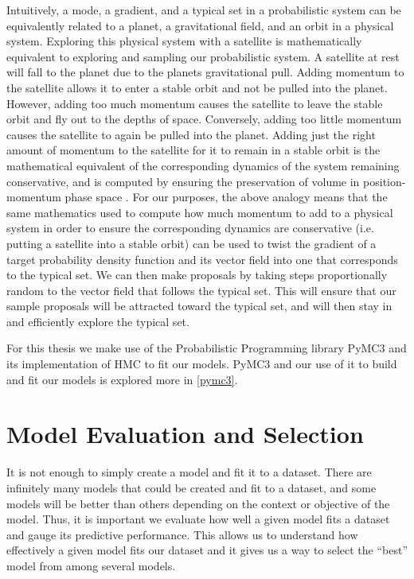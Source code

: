 Intuitively, a mode, a gradient, and a typical set in a probabilistic system can be equivalently related to a planet, a gravitational field, and an orbit in a physical system. Exploring this physical system with a satellite is mathematically equivalent to exploring and sampling our probabilistic system. A satellite at rest will fall to the planet due to the planets gravitational pull. Adding momentum to the satellite allows it to enter a stable orbit and not be pulled into the planet. However, adding too much momentum causes the satellite to leave the stable orbit and fly out to the depths of space. Conversely, adding too little momentum causes the satellite to again be pulled into the planet. Adding just the right amount of momentum to the satellite for it to remain in a stable orbit is the mathematical equivalent of the corresponding dynamics of the system remaining conservative, and is computed by ensuring the preservation of volume in position-momentum phase space \cite{Betancourt2017}. For our purposes, the above analogy means that the same mathematics used to compute how much momentum to add to a physical system in order to ensure the corresponding dynamics are conservative (i.e. putting a satellite into a stable orbit) can be used to twist the gradient of a target probability density function and its vector field into one that corresponds to the typical set. We can then make proposals by taking steps proportionally random to the vector field that follows the typical set. This will ensure that our sample proposals will be attracted toward the typical set, and will then stay in and efficiently explore the typical set.

For this thesis we make use of the Probabilistic Programming library PyMC3 \cite{pymc3} and its implementation of HMC to fit our models. PyMC3 and our use of it to build and fit our models is explored more in \ref{pymc3}.

\section{Model Evaluation and Selection}

It is not enough to simply create a model and fit it to a dataset. There are infinitely many models that could be created and fit to a dataset, and some models will be better than others depending on the context or objective of the model. Thus, it is important we evaluate how well a given model fits a dataset and gauge its predictive performance. This allows us to understand how effectively a given model fits our dataset and it gives us a way to select the ``best'' model from among several models.

